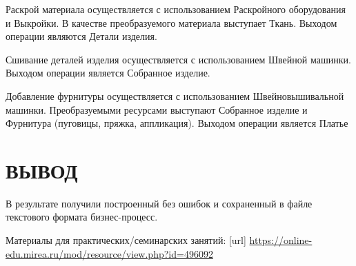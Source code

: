\newpage

Раскрой материала осуществляется с использованием Раскройного оборудования и Выкройки.
В качестве преобразуемого материала выступает Ткань.
Выходом операции являются Детали изделия.

Сшивание деталей изделия осуществляется с использованием Швейной машинки.
Выходом операции является Собранное изделие.

Добавление фурнитуры осуществляется с использованием Швейновышивальной машинки.
Преобразуемыми ресурсами выступают Собранное изделие и Фурнитура (пуговицы, пряжка, аппликация).
Выходом операции является Платье


\newpage

\section*{ВЫВОД}
В результате получили построенный без ошибок и сохраненный в файле текстового
формата бизнес-процесс.


\begin{thebibliography}{}
	\bibitem{}  Материалы для практических/семинарских занятий: [url]
	\url{https://online-edu.mirea.ru/mod/resource/view.php?id=496092}
\end{thebibliography}